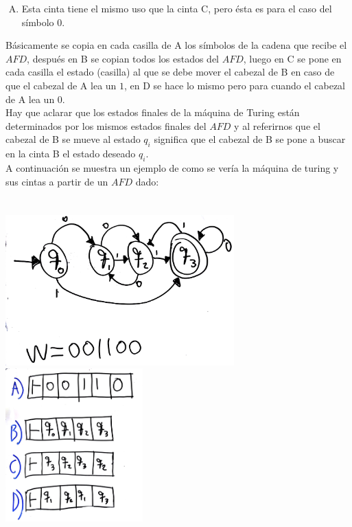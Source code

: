 \documentclass[letterpaper,10pt]{article}
\begin{document}
\begin{enumerate}
\begin{enumerate}[A)]
       				\item Esta cinta tiene el mismo uso que la cinta C, pero ésta es para el caso del símbolo $0$.
       			\end{enumerate}
       			
       			Básicamente se copia en cada casilla de A los símbolos de la cadena que recibe el $AFD$, después en B se copian todos los estados del $AFD$, luego en C se pone en cada casilla el estado (casilla) al que se debe mover el cabezal de B en caso de que el cabezal de A lea un $1$, en D se hace lo mismo pero para cuando el cabezal de A lea un $0$.\\ 
       			
       			Hay que aclarar que los estados finales de la máquina de Turing están determinados por los mismos estados finales del $AFD$ y al referirnos que el cabezal de B se mueve al estado $q_i$ significa que el cabezal de B se pone a buscar en la cinta B el estado deseado $q_i$.\\
       			
       			\newpage
       			A continuación se muestra un ejemplo de como se vería la máquina de turing y sus cintas a partir de un $AFD$ dado:\\ \\ \\
       				\includegraphics[width=250pt]{./images/img7.JPG}\\
       				\includegraphics[width=150pt]{./images/img8.JPG}\\
       

\end{enumerate}
\end{document}
